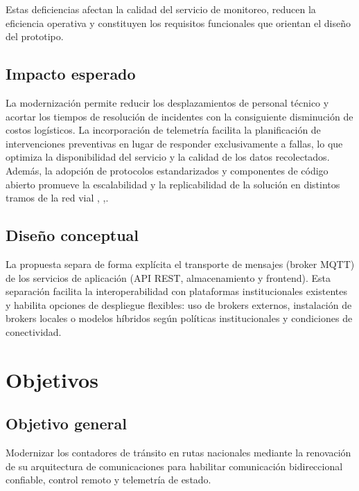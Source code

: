 Estas deficiencias afectan la calidad del servicio de monitoreo, reducen la eficiencia operativa y constituyen los requisitos funcionales que orientan el diseño del prototipo.




\subsection{Impacto esperado}
La modernización permite reducir los desplazamientos de personal técnico y acortar los tiempos de resolución de incidentes con la consiguiente disminución de costos logísticos. La incorporación de telemetría facilita la planificación de intervenciones preventivas en lugar de responder exclusivamente a fallas, lo que optimiza la disponibilidad del servicio y la calidad de los datos recolectados. Además, la adopción de protocolos estandarizados y componentes de código abierto promueve la escalabilidad y la replicabilidad de la solución en distintos tramos de la red vial \cite{miovision} ,\cite{sensys} ,\cite{metrocount}.
\subsection{Diseño conceptual} 
La propuesta separa de forma explícita el transporte de mensajes (broker MQTT) de los servicios de aplicación (API REST, almacenamiento y frontend). Esta separación facilita la interoperabilidad con plataformas institucionales existentes y habilita opciones de despliegue flexibles: uso de brokers externos, instalación de brokers locales o modelos híbridos según políticas institucionales y condiciones de conectividad.

\section{Objetivos}

\subsection{Objetivo general}

Modernizar los contadores de tránsito en rutas nacionales mediante la renovación de su arquitectura de comunicaciones para habilitar comunicación bidireccional confiable, control remoto y telemetría de estado.

